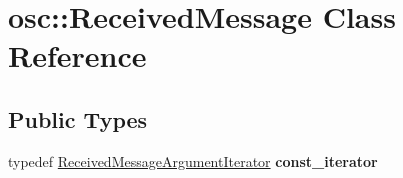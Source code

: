 \hypertarget{classosc_1_1_received_message}{}\section{osc\+:\+:Received\+Message Class Reference}
\label{classosc_1_1_received_message}
\subsection*{Public Types}
\begin{DoxyCompactItemize}
\item 
\mbox{\label{classosc_1_1_received_message_ad5c6854e472a9287eb07ce870157ce7c}} 
typedef \hyperlink{classosc_1_1_received_message_argument_iterator}{Received\+Message\+Argument\+Iterator} {\bfseries const\+\_\+iterator}
\end{DoxyCompactItemize}
